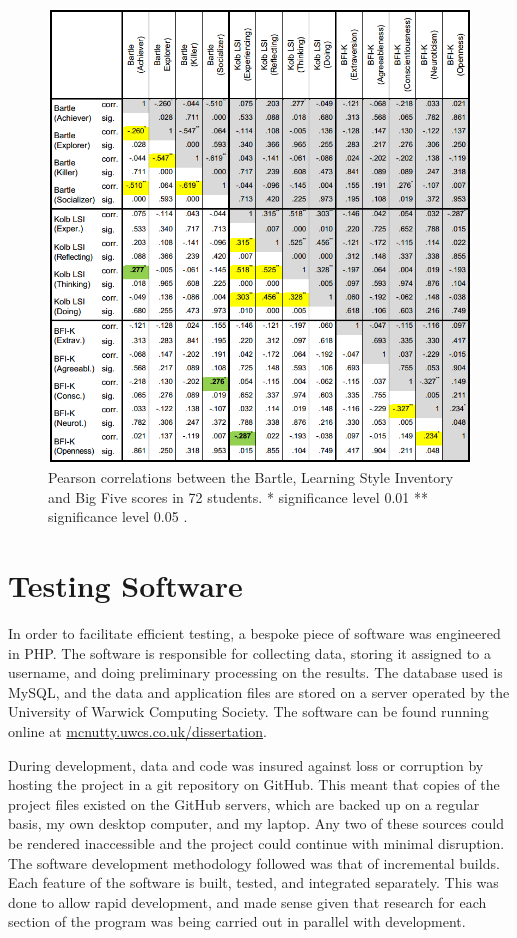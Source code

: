 \documentclass[12pt,a4paper,twoside]{report}
\begin{document}
\begin{figure}
\begin{center}
	\includegraphics[width=1\textwidth]{../img/bartle-big5.png}
	\caption{Pearson correlations between the Bartle, Learning Style Inventory and Big Five scores in 72 students. * significance level 0.01 ** significance level 0.05  \cite{konertmodeling}.}
	\label{correlation}
\end{center}
\end{figure}

\chapter{Testing Software}
In order to facilitate efficient testing, a bespoke piece of software was engineered in PHP. The software is responsible for collecting data, storing it assigned to a username, and doing preliminary processing on the results. The database used is MySQL, and the data and application files are stored on a server operated by the University of Warwick Computing Society. The software can be found running online at \url{mcnutty.uwcs.co.uk/dissertation}.

During development, data and code was insured against loss or corruption by hosting the project in a git repository on GitHub. This meant that copies of the project files existed on the GitHub servers, which are backed up on a regular basis, my own desktop computer, and my laptop. Any two of these sources could be rendered inaccessible and the project could continue with minimal disruption. The software development methodology followed was that of incremental builds. Each feature of the software is built, tested, and integrated separately. This was done to allow rapid development, and made sense given that research for each section of the program was being carried out in parallel with development.
\end{document}

